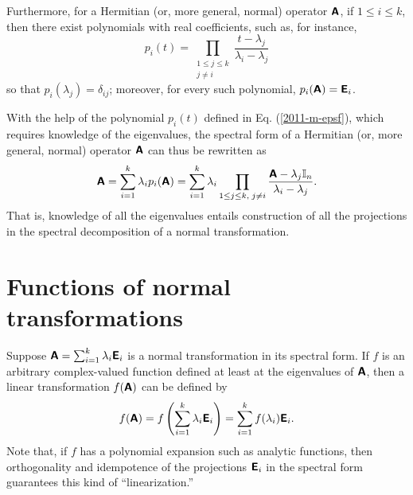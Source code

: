 Furthermore, for a  Hermitian (or, more general, normal) operator $\textsf{\textbf{A}}$,
if $1\le i \le k$,
then there exist polynomials with real coefficients, such as,  for instance,
\begin{equation}
p_i  (t)
=
\prod_{
\begin{array}{c}
1\le j\le k\\
j\neq i
\end{array}
}
\frac{t-\lambda_j}{\lambda_i -\lambda_j}
\label{2011-m-epsf}
\end{equation}
so that
$p_i(\lambda_j) =\delta_{ij}$;
moreover, for every such polynomial,
$p_i(\textsf{\textbf{A}})=\textsf{\textbf{E}}_i$.



With the help of the polynomial $p_i(t)$ defined in Eq. (\ref{2011-m-epsf}),
which requires knowledge of the eigenvalues,
the spectral form of a Hermitian (or, more general, normal) operator  $\textsf{\textbf{A}}$ can thus be rewritten as
\begin{equation}
\textsf{\textbf{A}}=\sum_{i=1}^k \lambda_i p_i(\textsf{\textbf{A}})=  \sum_{i=1}^k \lambda_i \prod_{
1\le j\le k,\;
j\neq i
}\frac{\textsf{\textbf{A}} - \lambda_j{\Bbb I}_n}{\lambda_i -\lambda_j}.
\end{equation}
That is, knowledge of all the eigenvalues entails construction
of all the projections in the spectral decomposition
of a normal transformation.




\section{Functions of normal transformations}
\label{2016-pu-book-chapter-qm-fono}

Suppose $\textsf{\textbf{A}}=\sum_{i=1}^k \lambda_i  \textsf{\textbf{E}}_i $ is a normal transformation
in its spectral form.
If $f$ is an arbitrary complex-valued function defined at least at the eigenvalues of $\textsf{\textbf{A}}$,
then a linear transformation  $f(\textsf{\textbf{A}})$ can be defined by
\begin{equation}
f(\textsf{\textbf{A}})=
f\left(\sum_{i=1}^k \lambda_i \textsf{\textbf{E}}_i\right)
=\sum_{i=1}^k f(\lambda_i)  \textsf{\textbf{E}}_i
 .
\end{equation}
Note that, if $f$ has a polynomial expansion such as analytic functions, then orthogonality and idempotence
of the projections $\textsf{\textbf{E}}_i $ in the spectral form guarantees this kind of ``linearization.''

